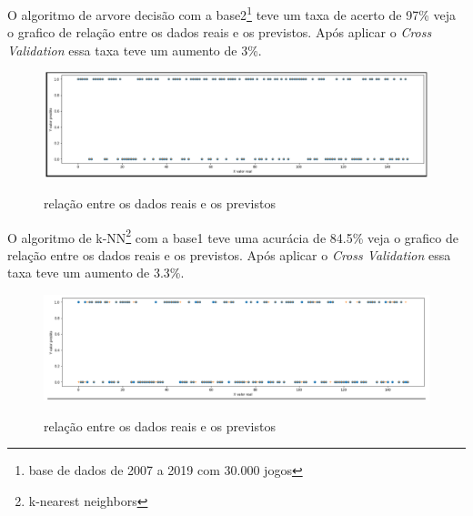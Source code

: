 O algoritmo de arvore decisão com a base2\footnote[5]{base de dados de 2007 a 2019 com 30.000 jogos} teve um taxa de acerto de 97\% veja o grafico de relação entre os dados reais e os previstos. Após aplicar o \textit{Cross Validation} essa taxa teve um  aumento de 3\%.
\begin{figure}[htbp]
	\begin{center}
		\includegraphics[width=1.2\linewidth]{imagens/arvoredecisaoAPI.png}\\
	\end{center}
	\caption[relação entre os dados reais e os previstos]{relação entre os dados reais e os previstos}
	\label{fig:logo}
\end{figure}
\newpage
O algoritmo de k-NN\footnote[3]{k-nearest neighbors} com a base1 teve uma acurácia de 84.5\% veja o grafico de relação entre os dados reais e os previstos. Após aplicar o \textit{Cross Validation} essa taxa teve um aumento de 3.3\%.
\begin{figure}[htbp]
	\begin{center}
		\includegraphics[width=1.2\linewidth]{imagens/knn.png}\\
	\end{center}
	\caption[relação entre os dados reais e os previstos]{relação entre os dados reais e os previstos}
	\label{fig:logo}
\end{figure}

